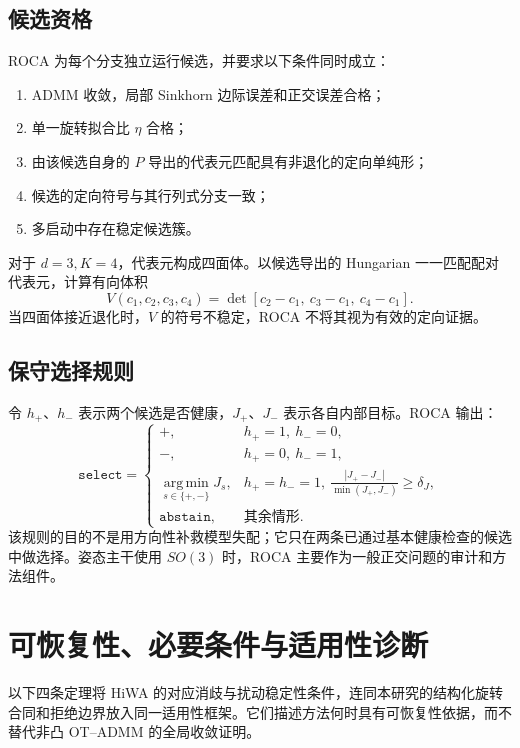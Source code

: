 \documentclass[10pt,a4paper,fontset=windows]{ctexart}
\newcommand{\argmin}{\operatorname*{arg\,min}}
\theoremstyle{definition}
\theoremstyle{remark}
\begin{document}
\subsection{候选资格}
ROCA 为每个分支独立运行候选，并要求以下条件同时成立：
\begin{enumerate}
  \item ADMM 收敛，局部 Sinkhorn 边际误差和正交误差合格；
  \item 单一旋转拟合比 $\eta$ 合格；
  \item 由该候选自身的 $P$ 导出的代表元匹配具有非退化的定向单纯形；
  \item 候选的定向符号与其行列式分支一致；
  \item 多启动中存在稳定候选簇。
\end{enumerate}
对于 $d=3,K=4$，代表元构成四面体。以候选导出的 Hungarian 一一匹配配对代表元，计算有向体积
\begin{equation}
V(c_1,c_2,c_3,c_4)=
\det[c_2-c_1,\ c_3-c_1,\ c_4-c_1].
\end{equation}
当四面体接近退化时，$V$ 的符号不稳定，ROCA 不将其视为有效的定向证据。

\subsection{保守选择规则}
令 $h_+$、$h_-$ 表示两个候选是否健康，$J_+$、$J_-$ 表示各自内部目标。ROCA 输出：
\begin{equation}
\texttt{select}=
\begin{cases}
+,&h_+=1,\ h_-=0,\\
-,&h_+=0,\ h_-=1,\\
\argmin_{s\in\{+,-\}}J_s,&h_+=h_-=1,\ 
\frac{|J_+-J_-|}{\min(J_+,J_-)}\ge\delta_J,\\
\texttt{abstain},&\text{其余情形}.
\end{cases}
\label{eq:roca-rule}
\end{equation}
该规则的目的不是用方向性补救模型失配；它只在两条已通过基本健康检查的候选中做选择。姿态主干使用 $SO(3)$ 时，ROCA 主要作为一般正交问题的审计和方法组件。

\section{可恢复性、必要条件与适用性诊断}
\label{sec:theory}
以下四条定理将 HiWA 的对应消歧与扰动稳定性条件，连同本研究的结构化旋转合同和拒绝边界放入同一适用性框架\cite{lee2019hierarchical}。它们描述方法何时具有可恢复性依据，而不替代非凸 OT--ADMM 的全局收敛证明。
\end{document}

